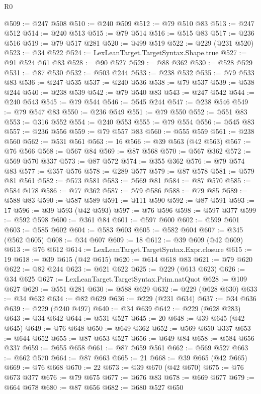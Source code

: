\begin{lexlean}{R0}
\begin{coremodule}
@509 := @247 @508
@510 := @240 @509
@512 := @79 @510 @83
@513 := @247 @512
@514 := @240 @513
@515 := @79 @514
@516 := @515 @83
@517 := @236 @516
@519 := @79 @517 @281
@520 := @499 @519
@522 := @229 (@231 @520)
@523 := @34 @522
@524 := LexLeanTarget.TargetSyntax.Shape.true
@527 := @91 @524 @61 @83
@528 := @90 @527
@529 := @88 @362
@530 := @528 @529
@531 := @87 @530
@532 := @503 @244
@533 := @238 @532
@535 := @79 @533 @83
@536 := @247 @535
@537 := @240 @536
@538 := @79 @537
@539 := @538 @244
@540 := @238 @539
@542 := @79 @540 @83
@543 := @247 @542
@544 := @240 @543
@545 := @79 @544
@546 := @545 @244
@547 := @238 @546
@549 := @79 @547 @83
@550 := @236 @549
@551 := @79 @550
@552 := @551 @83
@553 := @316 @552
@554 := @240 @553
@555 := @79 @554
@556 := @545 @83
@557 := @236 @556
@559 := @79 @557 @83
@560 := @555 @559
@561 := @238 @560
@562 := @531 @561
@563 := 16
@566 := @39 @563 (@42 @563)
@567 := @76 @566
@568 := @567 @84
@569 := @87 @568
@570 := @567 @362
@572 := @569 @570 @337
@573 := @87 @572
@574 := @355 @362
@576 := @79 @574 @83
@577 := @357 @576
@578 := @289 @577
@579 := @87 @578
@581 := @579 @81 @561
@582 := @573 @581
@583 := @569 @81
@584 := @87 @570
@585 := @584 @178
@586 := @77 @362
@587 := @79 @586
@588 := @79 @85
@589 := @588 @83
@590 := @587 @589
@591 := @111 @590
@592 := @87 @591
@593 := 17
@596 := @39 @593 (@42 @593)
@597 := @76 @596
@598 := @597 @377
@599 := @592 @598
@600 := @361 @84
@601 := @597 @600
@602 := @599 @601
@603 := @585 @602
@604 := @583 @603
@605 := @582 @604
@607 := @345 (@562 @605)
@608 := @34 @607
@609 := 18
@612 := @39 @609 (@42 @609)
@613 := @76 @612
@614 := LexLeanTarget.TargetSyntax.Expr.closure
@615 := 19
@618 := @39 @615 (@42 @615)
@620 := @614 @618 @83
@621 := @79 @620
@622 := @82 @244
@623 := @621 @622
@625 := @229 (@613 @623)
@626 := @34 @625
@627 := LexLeanTarget.TargetSyntax.Prim.natQuot
@628 := @109 @627
@629 := @551 @281
@630 := @588 @629
@632 := @229 (@628 @630)
@633 := @34 @632
@634 := @82 @629
@636 := @229 (@231 @634)
@637 := @34 @636
@639 := @229 (@240 @497)
@640 := @34 @639
@642 := @229 (@628 @283)
@643 := @34 @642
@644 := @531 @527
@645 := 20
@648 := @39 @645 (@42 @645)
@649 := @76 @648
@650 := @649 @362
@652 := @569 @650 @337
@653 := @644 @652
@655 := @87 @653 @527
@656 := @649 @84
@658 := @584 @656 @337
@659 := @655 @658
@661 := @87 @659 @561
@662 := @569 @527
@663 := @662 @570
@664 := @87 @663
@665 := 21
@668 := @39 @665 (@42 @665)
@669 := @76 @668
@670 := 22
@673 := @39 @670 (@42 @670)
@675 := @76 @673 @377
@676 := @79 @675
@677 := @676 @83
@678 := @669 @677
@679 := @664 @678
@680 := @87 @656
@682 := @680 @527 @650

\end{coremodule}
\end{lexlean}
